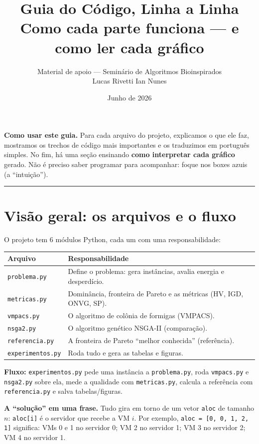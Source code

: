 \documentclass[11pt]{article}
\title{\textbf{Guia do Código, Linha a Linha}\\[3pt]
\large Como cada parte funciona --- e como ler cada gráfico}
\author{Material de apoio --- Seminário de Algoritmos Bioinspirados\\
\small Lucas Rivetti \quad Ian Nunes}
\date{Junho de 2026}
\begin{document}
\maketitle
\begin{ideia}
\textbf{Como usar este guia.} Para cada arquivo do projeto, explicamos o que ele
faz, mostramos os trechos de código mais importantes e os traduzimos em
português simples. No fim, há uma seção ensinando \textbf{como interpretar cada
gráfico} gerado. Não é preciso saber programar para acompanhar: foque nos boxes
azuis (a ``intuição'').
\end{ideia}
\tableofcontents
\vspace{4pt}\hrule

\section{Visão geral: os arquivos e o fluxo}
O projeto tem 6 módulos Python, cada um com uma responsabilidade:
\begin{center}\small
\begin{tabular}{ll}
\hline
\textbf{Arquivo} & \textbf{Responsabilidade} \\
\hline
\texttt{problema.py} & Define o problema: gera instâncias, avalia energia e desperdício. \\
\texttt{metricas.py} & Dominância, fronteira de Pareto e as métricas (HV, IGD, ONVG, SP). \\
\texttt{vmpacs.py} & O algoritmo de colônia de formigas (VMPACS). \\
\texttt{nsga2.py} & O algoritmo genético NSGA-II (comparação). \\
\texttt{referencia.py} & A fronteira de Pareto ``melhor conhecida'' (referência). \\
\texttt{experimentos.py} & Roda tudo e gera as tabelas e figuras. \\
\hline
\end{tabular}
\end{center}
\textbf{Fluxo:} \texttt{experimentos.py} pede uma instância a \texttt{problema.py},
roda \texttt{vmpacs.py} e \texttt{nsga2.py} sobre ela, mede a qualidade com
\texttt{metricas.py}, calcula a referência com \texttt{referencia.py} e salva
tabelas/figuras.

\begin{ideia}
\textbf{A ``solução'' em uma frase.} Tudo gira em torno de um vetor
\texttt{aloc} de tamanho $n$: \texttt{aloc[i]} é o servidor que recebe a VM
$i$. Por exemplo, \texttt{aloc = [0, 0, 1, 2, 1]} significa: VMs 0 e 1 no
servidor 0; VM 2 no servidor 1; VM 3 no servidor 2; VM 4 no servidor 1.
\end{ideia}
\end{document}
